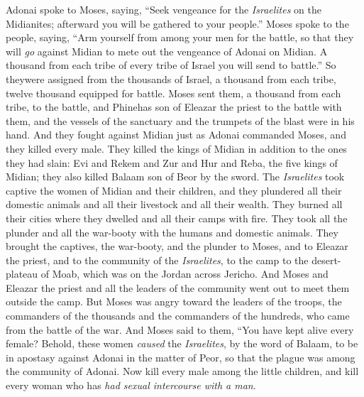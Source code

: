 \begin{biblechapter} %
 Adonai spoke to Moses, saying,
\verse “Seek vengeance for the \textit{Israelites} on the Midianites; afterward you will be gathered to your people.”
\verse Moses spoke to the people, saying, “Arm yourself from among your men for the battle, so that they will \textit{go} against Midian to mete out the vengeance of Adonai on Midian.
\verse A thousand from each tribe of every tribe of Israel you will send to battle.”
\verse So theywere assigned from the thousands of Israel, a thousand from each tribe, twelve thousand equipped for battle.
\verse Moses sent them, a thousand from each tribe, to the battle, and Phinehas son of Eleazar the priest to the battle with them, and the vessels of the sanctuary and the trumpets of the blast were in his hand.
\verse And they fought against Midian just as Adonai commanded Moses, and they killed every male.
\verse They killed the kings of Midian in addition to the ones they had slain: Evi and Rekem and Zur and Hur and Reba, the five kings of Midian; they also killed Balaam son of Beor by the sword.
\verse The \textit{Israelites} took captive the women of Midian and their children, and they plundered all their domestic animals and all their livestock and all their wealth.
\verse They burned all their cities where they dwelled and all their camps with fire.
\verse They took all the plunder and all the war-booty with the humans and domestic animals.
\verse They brought the captives, the war-booty, and the plunder to Moses, and to Eleazar the priest, and to the community of the \textit{Israelites}, to the camp to the desert-plateau of Moab, which was on the Jordan across Jericho.
\verse And Moses and Eleazar the priest and all the leaders of the community went out to meet them outside the camp.
\verse But Moses was angry toward the leaders of the troops, the commanders of the thousands and the commanders of the hundreds, who came from the battle of the war.
\verse And Moses said to them, “You have kept alive every female?
\verse Behold, these women \textit{caused} the \textit{Israelites}, by the word of Balaam, to be in apostasy against Adonai in the matter of Peor, so that the plague was among the community of Adonai.
\verse Now kill every male among the little children, and kill every woman who has \textit{had sexual intercourse with a man}.

\end{biblechapter}
